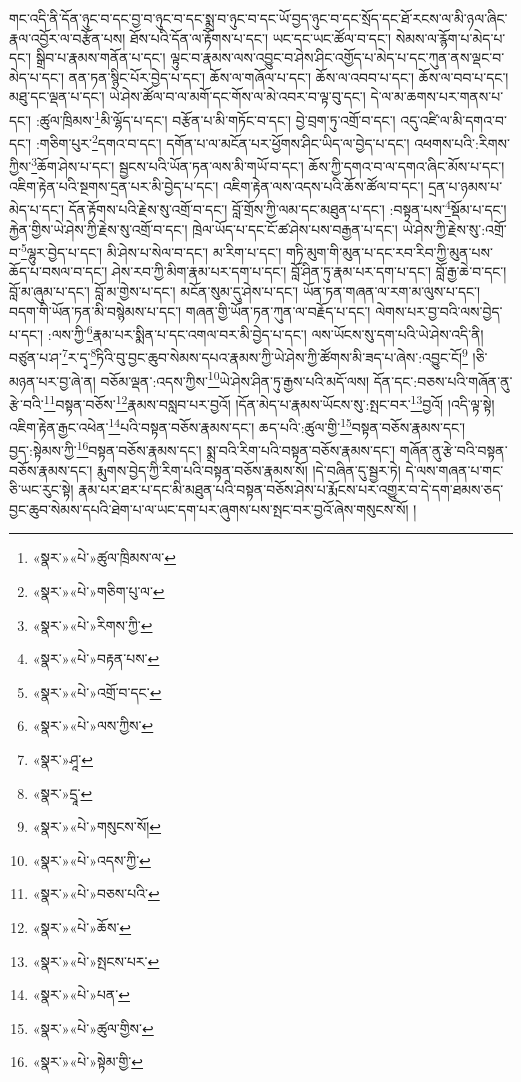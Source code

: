 གང་འདི་ནི་དོན་ཉུང་བ་དང་བྱ་བ་ཉུང་བ་དང་སྨྲ་བ་ཉུང་བ་དང་ཡོ་བྱད་ཉུང་བ་དང་སྲོད་དང་ཐོ་རངས་ལ་མི་ཉལ་ཞིང་རྣལ་འབྱོར་ལ་བརྩོན་པས། ཐོས་པའི་དོན་ལ་རྟོགས་པ་དང་། ཡང་དང་ཡང་ཚོལ་བ་དང་། སེམས་ལ་རྙོག་པ་མེད་པ་དང་། སྒྲིབ་པ་རྣམས་གནོན་པ་དང་། ལྟུང་བ་རྣམས་ལས་འབྱུང་བ་ཤེས་ཤིང་འགྱོད་པ་མེད་པ་དང་ཀུན་ནས་ལྡང་བ་མེད་པ་དང་། ནན་ཏན་སྙིང་པོར་བྱེད་པ་དང་། ཆོས་ལ་གཞོལ་པ་དང་། ཆོས་ལ་འབབ་པ་དང་། ཆོས་ལ་བབ་པ་དང་། མཐུ་དང་ལྡན་པ་དང་། ཡེ་ཤེས་ཚོལ་བ་ལ་མགོ་དང་གོས་ལ་མེ་འབར་བ་ལྟ་བུ་དང་། དེ་ལ་མ་ཆགས་པར་གནས་པ་དང་། :ཚུལ་ཁྲིམས་\footnote{«སྣར་»«པེ་»ཚུལ་ཁྲིམས་ལ་}མི་ལྷོད་པ་དང་། བརྩོན་པ་མི་གཏོང་བ་དང་། བྱེ་བྲག་ཏུ་འགྲོ་བ་དང་། འདུ་འཛི་ལ་མི་དགའ་བ་དང་། :གཅིག་པུར་\footnote{«སྣར་»«པེ་»གཅིག་པུ་ལ་}དགའ་བ་དང་། དགོན་པ་ལ་མངོན་པར་ཕྱོགས་ཤིང་ཡིད་ལ་བྱེད་པ་དང་། འཕགས་པའི་:རིགས་ཀྱིས་\footnote{«སྣར་»«པེ་»རིགས་ཀྱི་}ཆོག་ཤེས་པ་དང་། སྦྱངས་པའི་ཡོན་ཏན་ལས་མི་གཡོ་བ་དང་། ཆོས་ཀྱི་དགའ་བ་ལ་དགའ་ཞིང་མོས་པ་དང་། འཇིག་རྟེན་པའི་སྔགས་དྲན་པར་མི་བྱེད་པ་དང་། འཇིག་རྟེན་ལས་འདས་པའི་ཆོས་ཚོལ་བ་དང་། དྲན་པ་ཉམས་པ་མེད་པ་དང་། དོན་རྟོགས་པའི་རྗེས་སུ་འགྲོ་བ་དང་། བློ་གྲོས་ཀྱི་ལམ་དང་མཐུན་པ་དང་། :བསྟན་པས་\footnote{«སྣར་»«པེ་»བརྟན་པས་}སྡོམ་པ་དང་། རྐྱེན་གྱིས་ཡེ་ཤེས་ཀྱི་རྗེས་སུ་འགྲོ་བ་དང་། ཁྲེལ་ཡོད་པ་དང་ངོ་ཚ་ཤེས་པས་བརྒྱན་པ་དང་། ཡེ་ཤེས་ཀྱི་རྗེས་སུ་:འགྲོ་བ་\footnote{«སྣར་»«པེ་»འགྲོ་བ་དང་}ལྷུར་བྱེད་པ་དང་། མི་ཤེས་པ་སེལ་བ་དང་། མ་རིག་པ་དང་། གཏི་མུག་གི་མུན་པ་དང་རབ་རིབ་ཀྱི་མུན་པས་ཆོད་པ་བསལ་བ་དང་། ཤེས་རབ་ཀྱི་མིག་རྣམ་པར་དག་པ་དང་། བློ་ཤིན་ཏུ་རྣམ་པར་དག་པ་དང་། བློ་རྒྱ་ཆེ་བ་དང་། བློ་མ་ཞུམ་པ་དང་། བློ་མ་གྱེས་པ་དང་། མངོན་སུམ་དུ་ཤེས་པ་དང་། ཡོན་ཏན་གཞན་ལ་རག་མ་ལུས་པ་དང་། བདག་གི་ཡོན་ཏན་མི་བསྙེམས་པ་དང་། གཞན་གྱི་ཡོན་ཏན་ཀུན་ལ་བརྗོད་པ་དང་། ལེགས་པར་བྱ་བའི་ལས་བྱེད་པ་དང་། :ལས་ཀྱི་\footnote{«སྣར་»«པེ་»ལས་ཀྱིས་}རྣམ་པར་སྨིན་པ་དང་འགལ་བར་མི་བྱེད་པ་དང་། ལས་ཡོངས་སུ་དག་པའི་ཡེ་ཤེས་འདི་ནི། བཙུན་པ་ཤ་\footnote{«སྣར་»ཤཱ་}ར་དྭ་\footnote{«སྣར་»དྲཱ་}ཏིའི་བུ་བྱང་ཆུབ་སེམས་དཔའ་རྣམས་ཀྱི་ཡེ་ཤེས་ཀྱི་ཚོགས་མི་ཟད་པ་ཞེས་:འབྱུང་ངོ།\footnote{«སྣར་»«པེ་»གསུངས་སོ།} །ཅི་མཉན་པར་བྱ་ཞེ་ན། བཅོམ་ལྡན་:འདས་ཀྱིས་\footnote{«སྣར་»«པེ་»འདས་ཀྱི་}ཡེ་ཤེས་ཤིན་ཏུ་རྒྱས་པའི་མདོ་ལས། དོན་དང་:བཅས་པའི་གཞོན་ནུ་རྩེ་བའི་\footnote{«སྣར་»«པེ་»བཅས་པའི་}བསྟན་བཅོས་\footnote{«སྣར་»«པེ་»ཆོས་}རྣམས་བསླབ་པར་བྱའོ། །དོན་མེད་པ་རྣམས་ཡོངས་སུ་:སྤང་བར་\footnote{«སྣར་»«པེ་»སྤངས་པར་}བྱའོ། །འདི་ལྟ་སྟེ། འཇིག་རྟེན་རྒྱང་འཕེན་\footnote{«སྣར་»«པེ་»པན་}པའི་བསྟན་བཅོས་རྣམས་དང་། ཆད་པའི་:ཚུལ་གྱི་\footnote{«སྣར་»«པེ་»ཚུལ་གྱིས་}བསྟན་བཅོས་རྣམས་དང་། བྱད་:སྟེམས་ཀྱི་\footnote{«སྣར་»«པེ་»སྟེམ་གྱི་}བསྟན་བཅོས་རྣམས་དང་། སྨྲ་བའི་རིག་པའི་བསྟན་བཅོས་རྣམས་དང་། གཞོན་ནུ་རྩེ་བའི་བསྟན་བཅོས་རྣམས་དང་། རྨུགས་བྱེད་ཀྱི་རིག་པའི་བསྟན་བཅོས་རྣམས་སོ། །དེ་བཞིན་དུ་སྦྱར་ཏེ། དེ་ལས་གཞན་པ་གང་ཅི་ཡང་རུང་སྟེ། རྣམ་པར་ཐར་པ་དང་མི་མཐུན་པའི་བསྟན་བཅོས་ཤེས་པ་རྨོངས་པར་འགྱུར་བ་དེ་དག་ཐམས་ཅད་བྱང་ཆུབ་སེམས་དཔའི་ཐེག་པ་ལ་ཡང་དག་པར་ཞུགས་པས་སྤང་བར་བྱའོ་ཞེས་གསུངས་སོ། །
